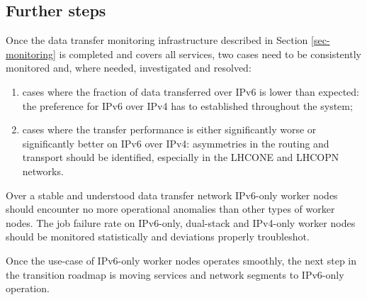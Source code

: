 \subsection{Further steps}
Once the data transfer monitoring infrastructure described in Section
\ref{sec-monitoring} is completed and covers all services, two cases
need to be consistently monitored and, where needed, investigated
and resolved:
\begin{enumerate}
\item cases where the fraction of data transferred over IPv6 is lower than expected:
the preference for IPv6 over IPv4 has to established throughout the system;
\item cases where the transfer performance is either significantly worse 
or significantly better on IPv6 over IPv4: asymmetries in the routing and
transport should be identified, especially in the LHCONE and LHCOPN networks.
\end{enumerate}
\par
Over a stable and understood data transfer network 
IPv6-only worker nodes should encounter no more operational anomalies
than other types of worker nodes. The 
job failure rate on IPv6-only, dual-stack and IPv4-only worker nodes should
be monitored statistically and deviations properly troubleshot.
\par
Once the use-case of IPv6-only worker nodes operates smoothly, the next
step in the transition roadmap is moving services and network segments to
IPv6-only operation.


